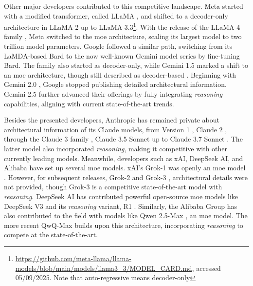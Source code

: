 Other major developers contributed to this competitive landscape. Meta started with a modified transformer, called LLaMA \cite{touvron_llama_2023}, and shifted to a decoder-only architecture in LLaMA 2 \cite{touvron_llama_2023-1} up to LLaMA 3.3\footnote{\url{https://github.com/meta-llama/llama-models/blob/main/models/llama3_3/MODEL_CARD.md}, accessed 05/09/2025. Note that auto-regressive means decoder-only}. With the release of the LLaMA 4 family \cite{meta_ai_llama_2025}, Meta switched to the \ac{moe} architecture, scaling its largest model to two trillion model parameters. Google followed a similar path, switching from its LaMDA-based Bard \cite{pichai_important_2023,thoppilan_lamda_2022} to the now well-known Gemini model series \cite{team_gemini_2024} by fine-tuning Bard. The family also started as decoder-only, while Gemini 1.5 marked a shift to an \ac{moe} architecture, though still described as decoder-based \cite{team_gemini_2024-1}. Beginning with Gemini 2.0 \cite{pichai_introducing_2024}, Google stopped publishing detailed architectural information. Gemini 2.5 \cite{kavukcuoglu_gemini_2025} further advanced their offerings by fully integrating \textit{reasoning} capabilities, aligning with current state-of-the-art trends.

Besides the presented developers, Anthropic has remained private about architectural information of its Claude models, from Version 1 \cite{anthropic_introducing_2023}, Claude 2 \cite{anthropic_claude_2023}, through the Claude 3 family \cite{anthropic_introducing_2024-1}, Claude 3.5 Sonnet \cite{anthropic_introducing_2024} up to Claude 3.7 Sonnet \cite{anthropic_claude_2025}. The latter model also incorporated \textit{reasoning}, making it competitive with other currently leading models. Meanwhile, developers such as xAI, DeepSeek AI, and Alibaba have set up several \ac{moe} models. xAI's Grok-1 was openly an \ac{moe} model \cite{xai_open_2024}. However, for subsequent releases, Grok-2 \cite{xai_grok-2_2024} and Grok-3 \cite{xai_grok_2025}, architectural details were not provided, though Grok-3 is a competitive state-of-the-art model with \textit{reasoning}. DeepSeek AI has contributed powerful open-source \ac{moe} models like DeepSeek V3 \cite{deepseek-ai_deepseek-v3_2025} and its \textit{reasoning} variant, R1 \cite{deepseek-ai_deepseek-r1_2025}. Similarly, the Alibaba Group has also contributed to the field with models like Qwen 2.5-Max \cite{team_qwen25-max_2025}, an \ac{moe} model. The more recent QwQ-Max \cite{team_thinkthink_2025} builds upon this architecture, incorporating \textit{reasoning} to compete at the state-of-the-art.

